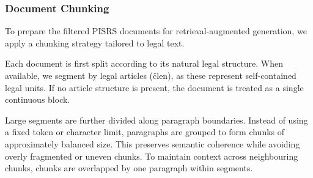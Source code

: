 \documentclass[fleqn,moreauthors,10pt]{ds_report}
\begin{document}
\subsubsection*{Document Chunking}
To prepare the filtered PISRS documents for retrieval-augmented generation, we apply a chunking strategy tailored to legal text.

Each document is first split according to its natural legal structure. When available, we segment by legal articles (člen), as these represent self-contained legal units. If no article structure is present, the document is treated as a single continuous block.

Large segments are further divided along paragraph boundaries. Instead of using a fixed token or character limit, paragraphs are grouped to form chunks of approximately balanced size. This preserves semantic coherence while avoiding overly fragmented or uneven chunks. To maintain context across neighbouring chunks, chunks are overlapped by one paragraph within segments.
\end{document}
